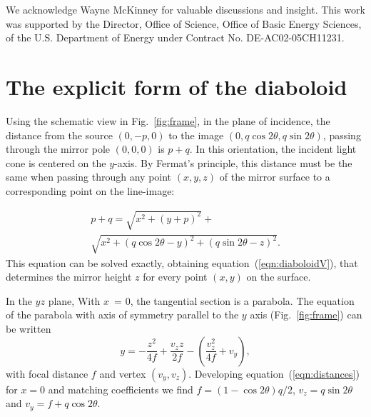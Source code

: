 \documentclass[preprint]{iucr}       %
\begin{document}
We acknowledge Wayne McKinney for valuable discussions and insight.
This work was supported by the Director, Office of Science, Office of Basic Energy Sciences, of the U.S. Department of Energy under Contract No. DE-AC02-05CH11231.

\appendix

\section{The explicit form of the diaboloid }
\label{appendix:diaboloid}

Using the schematic view in Fig.~\ref{fig:frame}, in the plane of incidence, the distance from the source $(0,-p,0)$ to the image $(0,q \cos2\theta, q \sin2\theta)$, passing through the mirror pole $(0,0,0)$ is $p+q$. In this orientation, the incident light cone is centered on the $y$-axis. By Fermat's principle, this distance must be the same when passing through any point $(x,y,z)$ of the mirror surface to a corresponding point on the line-image:

\begin{multline}
\label{eqn:distances}
p + q = 
\sqrt{x^2 + (y + p)^2} + \\
\sqrt{x^2 + (q \cos2 \theta - y)^2 + (q \sin2 \theta - z)^2}.
\end{multline}
This equation can be solved exactly, obtaining equation~(\ref{eqn:diaboloidV}), that determines the mirror height $z$ for every point $(x,y)$ on the surface.

In the $yz$ plane, With $x$~= 0, the tangential section is a parabola. The equation of the parabola with axis of symmetry parallel to the $y$ axis (Fig.~\ref{fig:frame}) can be written 
\begin{equation}
y = -\frac{z^2}{4 f} + \frac{v_z z}{2 f} - \left(\frac{v_z^2}{4 f} + v_y\right),
\end{equation}
\noindent with focal distance $f$ and vertex $(v_y,v_z)$. Developing equation~(\ref{eqn:distances}) for $x=0$ and matching coefficients we find $f=(1-\cos2\theta)q/2$, $v_z=q \sin2\theta$ and $v_y=f+q\cos2\theta$.
\end{document}
